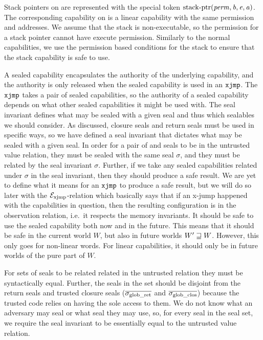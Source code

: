 \begin{jversion}
Stack pointers on \srccm{} are represented with the special token $\mathrm{stack\text{-}ptr}(\mathit{perm},\mathit{b},\mathit{e},\mathit{a})$.
The corresponding capability on \trgcm{} is a linear capability with the same permission and addresses.
We assume that the stack is non-executable, so the permission for a stack pointer cannot have execute permission.
Similarly to the normal capabilities, we use the permission based conditions for the stack to ensure that the stack capability is safe to use.

A sealed capability encapsulates the authority of the underlying capability, and the authority is only released when the sealed capability is used in an $\txjmp{}{}$.
The $\xjmp{}{}$ takes a pair of sealed capabilities, so the authority of a sealed capability depends on what other sealed capabilities it might be used with.
The seal invariant defines what may be sealed with a given seal and thus which sealables we should consider.
As discussed, closure seals and return seals must be used in specific ways, so we have defined a seal invariant that dictates what may be sealed with a given seal.
In order for a pair of \srccm{} and \trgcm{} seals to be in the untrusted value relation, they must be sealed with the same seal $\sigma$, and they must be related by the seal invariant $\sigma$.
Further, if we take any sealed capabilities related under $\sigma$ in the seal invariant, then they should produce a safe result.
We are yet to define what it means for an $\txjmp{}{}$ to produce a safe result, but we will do so later with the $\mathcal{E}_\mathrm{xjmp}$-relation which basically says that if an x-jump happened with the capabilities in question, then the resulting configuration is in the observation relation, i.e.\ it respects the memory invariants.
It should be safe to use the sealed capability both now and in the future.
This means that it should be safe in the current world $W$, but also in future worlds $W' \sqsupseteq W$.
However, this only goes for non-linear words.
For linear capabilities, it should only be in future worlds of the pure part of $W$.

For sets of seals to be related related in the untrusted relation they must be syntactically equal.
Further, the seals in the set should be disjoint from the return seals and trusted closure seals ($\overline{\sigma_{\mathrm{glob\_ret}}}$ and $\overline{\sigma_{\mathrm{glob\_clos}}}$) because the trusted code relies on having the sole access to them.
We do not know what an adversary may seal or what seal they may use, so, for every seal in the seal set, we require the seal invariant to be essentially equal to the untrusted value relation.


\end{jversion}
